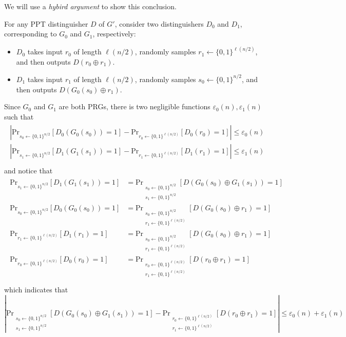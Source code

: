 \documentclass[8pt]{article}
\theoremstyle{compact}
\def\le{\leqslant}
\begin{document}
We will use a \textit{hybird argument} to show this conclusion.

For any PPT distinguisher $D$ of $G'$, consider two distinguishers $D_0$ and $D_1$, corresponding to $G_0$ and $G_1$, respectively:
\begin{itemize}
	\item $D_0$ takes input $r_0$ of length $\ell(n/2)$, randomly samples $r_1 \gets \{0, 1\}^{\ell(n/2)}$, and then outputs $D(r_0 \oplus r_1)$.
	\item $D_1$ takes input $r_1$ of length $\ell(n/2)$, randomly samples $s_0 \gets \{0, 1\}^{n/2}$, and then outputs $D(G_0(s_0) \oplus r_1)$.
\end{itemize}

Since $G_0$ and $G_1$ are both PRGs, there is two negligible functions $\varepsilon_0(n), \varepsilon_1(n)$ such that \begin{align*}
	\begin{split}
		\left| \text{Pr}_{s_0 \gets \{0, 1\}^{n/2}}[D_0(G_0(s_0)) = 1] - \text{Pr}_{r_0 \gets \{0, 1\}^{\ell(n/2)}}[D_0(r_0) = 1] \right| \le \varepsilon_0(n) \\
		\left| \text{Pr}_{s_1 \gets \{0, 1\}^{n/2}}[D_1(G_1(s_1)) = 1] - \text{Pr}_{r_1 \gets \{0, 1\}^{\ell(n/2)}}[D_1(r_1) = 1] \right| \le \varepsilon_1(n) \\
	\end{split}
\end{align*}
and notice that \begin{align*}
	\begin{split}
		\text{Pr}_{s_1 \gets \{0, 1\}^{n/2}}[D_1(G_1(s_1)) = 1] &= \text{Pr}_{\substack{s_0 \gets \{0, 1\}^{n/2} \\ s_1 \gets \{0, 1\}^{n/2}}}[D(G_0(s_0) \oplus G_1(s_1)) = 1] \\
		\text{Pr}_{s_0 \gets \{0, 1\}^{n/2}}[D_0(G_0(s_0)) = 1] &= \text{Pr}_{\substack{s_0 \gets \{0, 1\}^{n/2} \\ r_1 \gets \{0, 1\}^{\ell(n/2)}}}[D(G_0(s_0) \oplus r_1) = 1] \\ 
		\text{Pr}_{r_1 \gets \{0, 1\}^{\ell(n/2)}}[D_1(r_1) = 1] &= \text{Pr}_{\substack{s_0 \gets \{0, 1\}^{n/2} \\ r_1 \gets \{0, 1\}^{\ell(n/2)}}}[D(G_0(s_0) \oplus r_1) = 1] \\ 
		\text{Pr}_{r_0 \gets \{0, 1\}^{\ell(n/2)}}[D_0(r_0) = 1] &= \text{Pr}_{\substack{r_0 \gets \{0, 1\}^{\ell(n/2)} \\ r_1 \gets \{0, 1\}^{\ell(n/2)}}}[D(r_0 \oplus r_1) = 1]\\
	\end{split}
\end{align*}
which indicates that $$\left| \text{Pr}_{\substack{s_0 \gets \{0, 1\}^{n/2} \\ s_1 \gets \{0, 1\}^{n/2}}}[D(G_0(s_0) \oplus G_1(s_1)) = 1] - \text{Pr}_{\substack{r_0 \gets \{0, 1\}^{\ell(n/2)} \\ r_1 \gets \{0, 1\}^{\ell(n/2)}}}[D(r_0 \oplus r_1) = 1] \right| \le \varepsilon_0(n) + \varepsilon_1(n)$$
\end{document}
